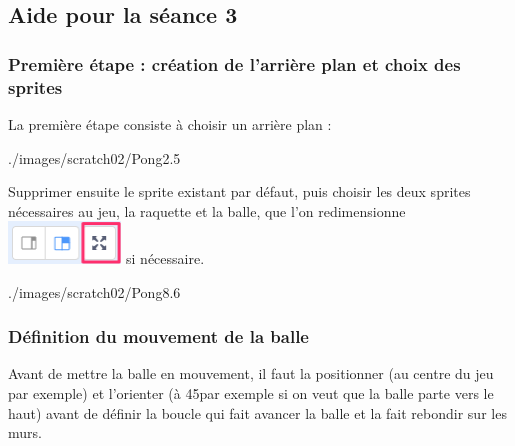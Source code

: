 





\subsection{Aide pour la séance 3}\label{aide_seanceScratch3}

\subsubsection{Première étape : création de l'arrière plan et choix des sprites} 

La première étape consiste à choisir un arrière plan :

%
              {./images/scratch02/Pong2}{.5\textwidth}

Supprimer ensuite le sprite existant par défaut, puis choisir les deux sprites nécessaires au jeu, la raquette et la balle, que l'on redimensionne \includegraphics[width=3cm]{./images/scratch02/redimension.png} si nécessaire.

%
              {./images/scratch02/Pong8}{.6\textwidth}

\subsubsection{Définition du mouvement de la balle} 

Avant de mettre la balle en mouvement, il faut la positionner (au centre du jeu par exemple) et l'orienter (à 45\degre par exemple si on veut que la balle parte vers le haut) avant de définir la boucle qui fait avancer la balle et la fait rebondir sur les murs.

